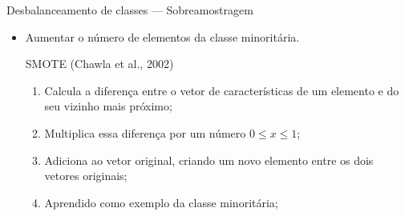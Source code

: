 \documentclass[10pt]{beamer}
\begin{document}
\begin{frame}{Desbalanceamento de classes --- Sobreamostragem}
  \setlength\leftmargini{1em}
    \begin{itemize}
    \item Aumentar o número de elementos da classe minoritária.
    \begin{block}{SMOTE (Chawla et al., 2002)}
      \setlength\leftmargini{1em}
      \begin{enumerate}
        \item Calcula a diferença entre o vetor de características de um elemento e do seu vizinho mais próximo;
        \item Multiplica essa diferença por um número $0 \leq x \leq 1$;
        \item Adiciona ao vetor original, criando um novo elemento entre os dois vetores originais;
        \item Aprendido como exemplo da classe minoritária;
      \end{enumerate}
    \end{block}
  \end{itemize}
\end{frame}
%
\end{document}
